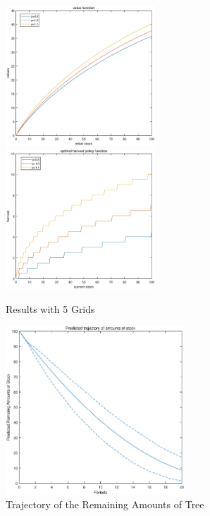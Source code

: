 \documentclass[10pt, letterpaper]{article}
\begin{document}
\begin{figure}
\includegraphics[width=0.5\textwidth]{value_grid5.eps}
\includegraphics[width=0.5\textwidth]{policy_grid5.eps}
\caption{Results with 5 Grids}
\end{figure}

\begin{figure}
\centering
\includegraphics[width=0.6\textwidth]{trajectory_grid21.eps}
\caption{Trajectory of the Remaining Amounts of Tree}
\end{figure}


\clearpage
\end{document}
